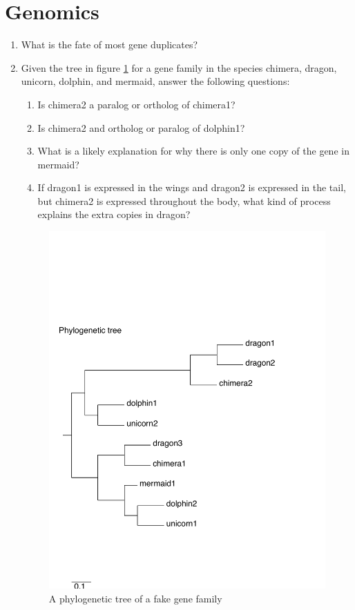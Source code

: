 \documentclass[]{article}
\begin{document}
\section*{Genomics}
\begin{enumerate}
\item  What is the fate of most gene duplicates?


\item Given the tree in figure \ref{fig:TREE} for a gene family in the species chimera, dragon, unicorn, dolphin, and mermaid, answer the following questions:
\begin{enumerate}
\item Is chimera2 a paralog or ortholog of chimera1?
\item Is chimera2 and ortholog or paralog of dolphin1?
\item What is a likely explanation for why there is only one copy of the gene in mermaid?
\item If dragon1 is expressed in the wings and dragon2 is expressed in the tail, but chimera2 is expressed throughout the body, what kind of process explains the extra copies in dragon?
\end{enumerate}

\begin{figure}[here]
\includegraphics[width=12cm]{faketree.pdf}
\caption{A phylogenetic tree of a fake gene family}
\label{fig:TREE}
\end{figure}
\pagebreak


\end{enumerate}
\end{document}
